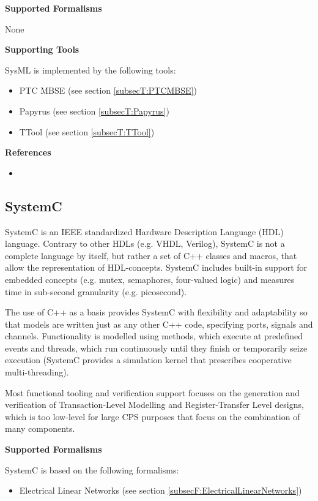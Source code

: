 \textbf{Supported Formalisms}

None


\textbf{Supporting Tools}

SysML is implemented by the following tools:
\begin{itemize}
	\item PTC MBSE (see section \ref{subsecT:PTCMBSE})
	\item Papyrus (see section \ref{subsecT:Papyrus})
	\item TTool (see section \ref{subsecT:TTool})
\end{itemize}


\textbf{References}
\begin{itemize}
	
\item {}
\end{itemize}



\subsection{SystemC}
\label{subsecL:SystemC}


SystemC is an IEEE standardized Hardware Description Language (HDL) language. Contrary to other HDLs (e.g. VHDL, Verilog), SystemC is not a complete language by itself, but rather a set of C++ classes and macros, that allow the representation of HDL-concepts. SystemC includes built-in support for embedded concepts (e.g. mutex, semaphores, four-valued logic) and measures time in sub-second granularity (e.g. picosecond).

The use of C++ as a basis provides SystemC with flexibility and adaptability so that models are written just as any other C++ code, specifying ports, signals and channels. Functionality is modelled using methods, which execute at predefined events and threads, which run continuously until they finish or temporarily seize execution (SystemC provides a simulation kernel that prescribes cooperative multi-threading).

Most functional tooling and verification support focuses on the generation and verification of  Transaction-Level Modelling and Register-Transfer Level designs, which is too low-level for large CPS purposes that focus on the combination of many components.

\textbf{Supported Formalisms}

SystemC is based on the following formalisms:
\begin{itemize}
	\item Electrical Linear Networks (see section \ref{subsecF:ElectricalLinearNetworks})
\end{itemize}


